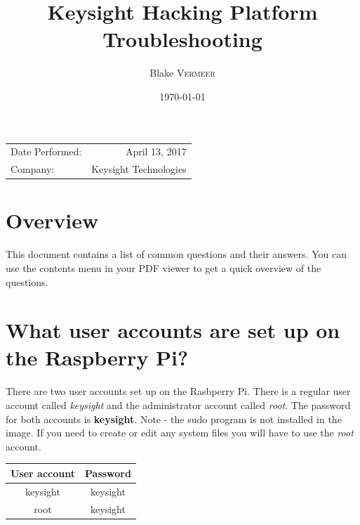 \documentclass{article}
\title{Keysight Hacking Platform Troubleshooting} %
\author{Blake \textsc{Vermeer}} %
\date{\today} %
\begin{document}
\maketitle %

\begin{center}
\begin{tabular}{l r}
Date Performed: & April 13, 2017 \\ %
Company: & Keysight Technologies %
\end{tabular}
\end{center}


\section{Overview}

This document contains a list of common questions and their answers. You can use the contents menu in your PDF viewer to get a quick overview of the questions.


\section{What user accounts are set up on the Raspberry Pi?}

There are two user accounts set up on the Rasbperry Pi. There is a regular user account called \textit{keysight} and the administrator account called \textit{root}. The password for both accounts is \textbf{keysight}. Note - the sudo program is not installed in the image. If you need to create or edit any system files you will have to use the \textit{root} account. 

	\begin{table}[H]
	\centering
	
		\begin{tabular}[H]{| c | c |}
			\hline
			\textbf{User account} & \textbf{Password} \\
			\hline
			keysight & keysight \\
			\hline
			root & keysight \\
			\hline
		\end{tabular}
	
	\end{table}
\end{document}
